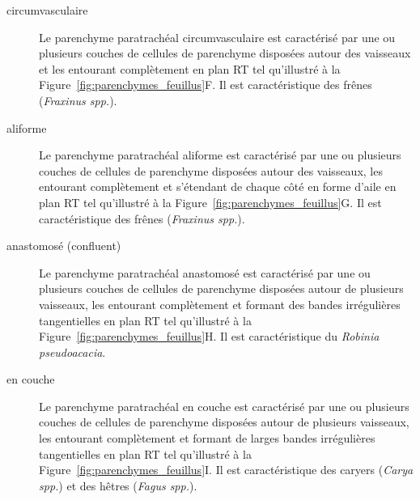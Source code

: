 \begin{description}
\begin{description}
	\item[circumvasculaire] Le parenchyme paratrachéal circumvasculaire est caractérisé par une ou plusieurs couches de cellules de parenchyme disposées autour des vaisseaux et les entourant complètement en plan RT tel qu'illustré à la Figure~\ref{fig:parenchymes_feuillus}F.  Il est caractéristique des frênes (\textit{Fraxinus spp.}).

	\item[aliforme] Le parenchyme paratrachéal aliforme est caractérisé par une ou plusieurs couches de cellules de parenchyme disposées autour des vaisseaux, les entourant complètement et s'étendant de chaque côté en forme d'aile en plan RT tel qu'illustré à la Figure~\ref{fig:parenchymes_feuillus}G. Il est caractéristique des frênes (\textit{Fraxinus spp.}).
	
	\item[anastomosé (confluent)] Le parenchyme paratrachéal anastomosé est caractérisé par une ou plusieurs couches de cellules de parenchyme disposées autour de plusieurs vaisseaux, les entourant complètement et formant des bandes irrégulières tangentielles en plan RT tel qu'illustré à la Figure~\ref{fig:parenchymes_feuillus}H. Il est caractéristique du \textit{Robinia pseudoacacia}.
	
	\item[en couche] Le parenchyme paratrachéal en couche est caractérisé par une ou plusieurs couches de cellules de parenchyme disposées autour de plusieurs vaisseaux, les entourant complètement et formant de larges bandes irrégulières tangentielles en plan RT tel qu'illustré à la Figure~\ref{fig:parenchymes_feuillus}I.  Il est caractéristique des caryers (\textit{Carya spp.}) et des hêtres (\textit{Fagus spp.}).
	
\end{description}

\end{description}

